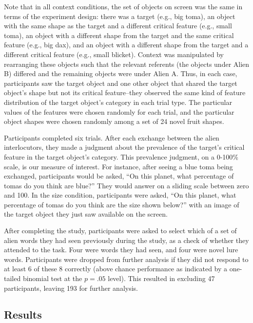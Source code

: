 \documentclass[
  english,
  man,floatsintext]{apa6}
\begin{document}
Note that in all context conditions, the set of objects on screen was the same in terms of the experiment design: there was a target (e.g., big toma), an object with the same shape as the target and a different critical feature (e.g., small toma), an object with a different shape from the target and the same critical feature (e.g., big dax), and an object with a different shape from the target and a different critical feature (e.g., small blicket). Context was manipulated by rearranging these objects such that the relevant referents (the objects under Alien B) differed and the remaining objects were under Alien A. Thus, in each case, participants saw the target object and one other object that shared the target object's shape but not its critical feature--they observed the same kind of feature distribution of the target object's category in each trial type. The particular values of the features were chosen randomly for each trial, and the particular object shapes were chosen randomly among a set of 24 novel fruit shapes.

Participants completed six trials. After each exchange between the alien interlocutors, they made a judgment about the prevalence of the target's critical feature in the target object's category. This prevalence judgment, on a 0-100\% scale, is our measure of interest. For instance, after seeing a blue toma being exchanged, participants would be asked, ``On this planet, what percentage of tomas do you think are blue?'' They would answer on a sliding scale between zero and 100. In the size condition, participants were asked, ``On this planet, what percentage of tomas do you think are the size shown below?'' with an image of the target object they just saw available on the screen.

After completing the study, participants were asked to select which of a set of alien words they had seen previously during the study, as a check of whether they attended to the task. Four were words they had seen, and four were novel lure words. Participants were dropped from further analysis if they did not respond to at least 6 of these 8 correctly (above chance performance as indicated by a one-tailed binomial test at the \(p = .05\) level). This resulted in excluding 47 participants, leaving 193 for further analysis.

\hypertarget{results-1}{%
\subsection{Results}\label{results-1}}
\end{document}
